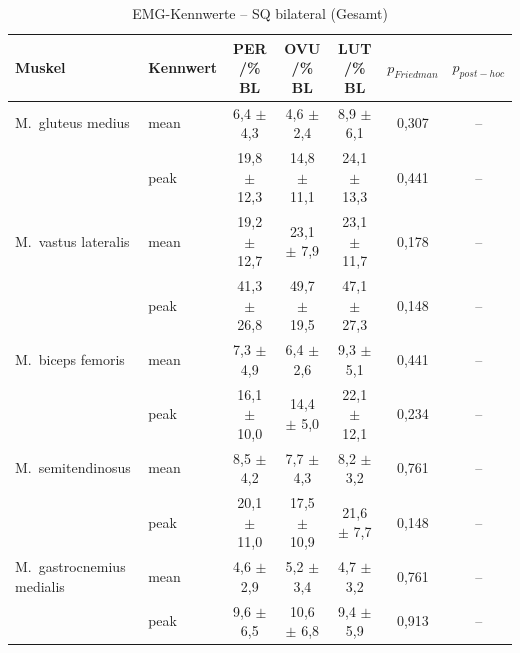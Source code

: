 \begin{table}[H]
  \centering
  \caption{EMG-Kennwerte – SQ bilateral (Gesamt)}
  \label{tab:SQ_bilateral_Gesamt}
  \small
  \begin{tabular}{l l c c c c c }
    \hline
\textbf{Muskel} & \textbf{Kennwert} & \textbf{PER /\% BL} & \textbf{OVU /\% BL} & \textbf{LUT /\% BL} & \textbf{$p_{Friedman}$} & \textbf{$p_{post-hoc}$} \\
    \hline
    M.~gluteus medius & mean & 6{,}4 $\pm$ 4{,}3 & 4{,}6 $\pm$ 2{,}4 & 8{,}9 $\pm$ 6{,}1 & 0{,}307 & --\\
     & peak & 19{,}8 $\pm$ 12{,}3 & 14{,}8 $\pm$ 11{,}1 & 24{,}1 $\pm$ 13{,}3 & 0{,}441 & --\\
    \hline
    M.~vastus lateralis & mean & 19{,}2 $\pm$ 12{,}7 & 23{,}1 $\pm$ 7{,}9 & 23{,}1 $\pm$ 11{,}7 & 0{,}178 & --\\
     & peak & 41{,}3 $\pm$ 26{,}8 & 49{,}7 $\pm$ 19{,}5 & 47{,}1 $\pm$ 27{,}3 & 0{,}148 & --\\
    \hline
    M.~biceps femoris & mean & 7{,}3 $\pm$ 4{,}9 & 6{,}4 $\pm$ 2{,}6 & 9{,}3 $\pm$ 5{,}1 & 0{,}441 & --\\
     & peak & 16{,}1 $\pm$ 10{,}0 & 14{,}4 $\pm$ 5{,}0 & 22{,}1 $\pm$ 12{,}1 & 0{,}234 & --\\
    \hline
    M.~semitendinosus & mean & 8{,}5 $\pm$ 4{,}2 & 7{,}7 $\pm$ 4{,}3 & 8{,}2 $\pm$ 3{,}2 & 0{,}761 & --\\
     & peak & 20{,}1 $\pm$ 11{,}0 & 17{,}5 $\pm$ 10{,}9 & 21{,}6 $\pm$ 7{,}7 & 0{,}148 & --\\
    \hline
    M.~gastrocnemius medialis & mean & 4{,}6 $\pm$ 2{,}9 & 5{,}2 $\pm$ 3{,}4 & 4{,}7 $\pm$ 3{,}2 & 0{,}761 & --\\
     & peak & 9{,}6 $\pm$ 6{,}5 & 10{,}6 $\pm$ 6{,}8 & 9{,}4 $\pm$ 5{,}9 & 0{,}913 & --\\
    \hline
  \end{tabular}
\end{table}

